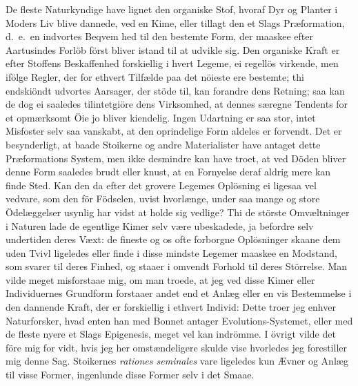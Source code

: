 \documentclass[12pt,a4paper]{article}
\newcommand{\opage}[1]{\marginnote{\footnotesize\textit{[#1]}}}
\begin{document}
De fleste Naturkyndige have lignet den organiske Stof, hvoraf Dyr og
Planter i Moders Liv blive dannede, ved en Kime, eller tillagt den et Slags
Præformation, d.~e.\ en indvortes Beqvem%
\opage{250}hed til den bestemte Form, der maaskee efter Aartusindes Forlöb först
bliver istand til at udvikle sig. Den organiske Kraft er efter Stoffens
Beskaffenhed forskiellig i hvert Legeme, ei regellös virkende, men ifölge
Regler, der for ethvert Tilfælde paa det nöieste ere bestemte; thi
endskiöndt udvortes Aarsager, der stöde til, kan forandre dens Retning; saa
kan de dog ei saaledes tilintetgiöre dens Virksomhed, at dennes særegne
Tendents for et opmærksomt Öie jo bliver kiendelig. Ingen Udartning er saa
stor, intet Misfoster selv saa vanskabt, at den oprindelige Form aldeles er
forvendt. Det er besynderligt, at baade Stoikerne og andre Materialister
have antaget dette Præformations System, men ikke desmindre kan have troet,
at ved Döden bliver denne Form saaledes brudt eller knust, at en Fornyelse
deraf aldrig mere kan finde Sted. Kan den da efter det grovere Legemes
Oplösning ei ligesaa vel vedvare, som den för Födselen, uvist hvorlænge,
under saa mange og store Ödelæggelser usynlig har vidst at holde sig
vedlige? Thi de störste Omvæltninger i Naturen lade de egentlige Kimer selv
være ubeskadede, ja befordre selv undertiden deres Væxt: de fineste og os
ofte forborgne Oplösninger skaane dem uden Tvivl ligeledes eller finde i
disse mindste Legemer maaskee en Modstand, som svarer til deres Finhed, og
staaer i omvendt Forhold til deres Störrelse. Man vilde meget misforstaae
mig, om man troede, at jeg ved disse Kimer eller Individuernes Grundform
forstaaer andet end et Anlæg eller en
\opage{251} vis Bestemmelse i den dannende Kraft, der er forskiellig i ethvert Individ:
Dette troer jeg enhver Naturforsker, hvad enten han med Bonnet antager
Evolutions-Systemet, eller med de fleste nyere et Slags Epigenesis, meget
vel kan indrömme. I övrigt vilde det före mig for vidt, hvis jeg her
omstændeligere skulde vise hvorledes jeg forestiller mig denne Sag.
Stoikernes \emph{rationes seminales} vare ligeledes kun Ævner og Anlæg til
visse Former, ingenlunde disse Former selv i det Smaae.
\end{document}
